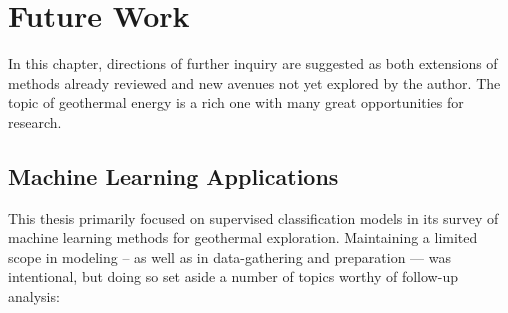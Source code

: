 \chapter{Future Work}
\label{ch9:future_work}

In this chapter, directions of further inquiry are suggested as both extensions of methods already reviewed and new avenues not yet explored by the author. The topic of geothermal energy is a rich one with many great opportunities for research.

\section{Machine Learning Applications}\label{ch9:future_work_ml}

This thesis primarily focused on supervised classification models in its survey of machine learning methods for geothermal exploration. Maintaining a limited scope in modeling -- as well as in data-gathering and preparation --- was intentional, but doing so set aside a number of topics worthy of follow-up analysis:

